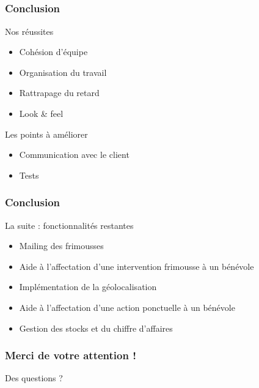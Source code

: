 \subsection{} %

\speaker{\Francois}
\begin{frame}
\frametitle{Conclusion}
\begin{block}{Nos réussites}
	\begin{itemize}
		\item Cohésion d'équipe
		\item Organisation du travail
		\item Rattrapage du retard
		\item Look \& feel
	\end{itemize}
\end{block}
\begin{block}{Les points à améliorer}
	\begin{itemize}
		\item Communication avec le client
		\item Tests
	\end{itemize}
\end{block}
\end{frame}
	
\begin{frame}
\frametitle{Conclusion}
\begin{block}{La suite : fonctionnalités restantes}
	\begin{itemize}
		\item Mailing des frimousses
		\item Aide à l'affectation d'une intervention frimousse à un bénévole
		\item Implémentation de la géolocalisation
		\item Aide à l'affectation d'une action ponctuelle à un bénévole
		\item Gestion des stocks et du chiffre d'affaires
	\end{itemize}
\end{block}
\end{frame}

\speaker{}
\begin{frame}
	\frametitle{Merci de votre attention !}
	\begin{center}\color{black}
		\Huge{Des questions ?}
	\end{center}
\end{frame}